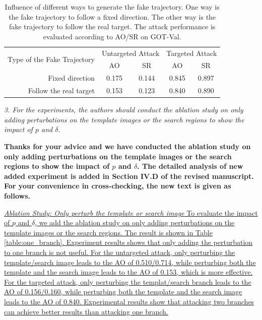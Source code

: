 \documentclass[12pt]{article}
\begin{document}
\begin{table}[t]
  \renewcommand\thetable{X}
  \centering
  \caption{Influence of different ways to generate the fake trajectory. One way is the fake trajectory to follow a fixed direction. The other way is the fake trajectory to follow the real target. The attack performance is evaluated according to AO/SR on GOT-Val.}
  \begin{tabular}{@{}rcccc@{}}
  \toprule
  \multirow{2}{*}[-2pt]{Type of the Fake Trajectory} & \multicolumn{2}{c}{Untargeted Attack} & \multicolumn{2}{c}{Targeted Attack} \\ \cmidrule{2-5}
                              & AO                & SR                & AO               & SR               \\ \midrule
  Fixed direction             & 0.175             & 0.144             & 0.845            & 0.897            \\
  Follow the real target      & 0.153             & 0.123             & 0.840            & 0.890            \\ \bottomrule        
  \end{tabular}
  \label{table:direction}
\end{table}

\textit{3. For the experiments, the authors should conduct the ablation study on only adding perturbations on the template images or the search regions to show the impact of $p$ and $\delta$.}

\textbf{Thanks for your advice and we have conducted the ablation study on only adding perturbations on the template images or the search regions to show the impact of $p$ and $\delta$.
The detailed analysis of new added experiment is added in Section IV.D of the revised manuscript. For your convenience in cross-checking, the new text is given as follows.}

\uline{\textit{Ablation Study: Only perturb the template or search image} To evaluate the impact of $p$ and $\delta$, we add the ablation study on only adding perturbations on the template images or the search regions. The result is shown in Table \ref{table:one_branch}. Experiment results shows that only adding the perturbation to one branch is not useful.
For the untargeted attack, only perturbing the template/search image leads to the AO of 0.510/0.714, while perturbing both the template and the search image leads to the AO of 0.153, which is more effective.
For the targeted attack, only perturbing the templat/search branch leads to the AO of 0.156/0.160, while perturbing both the template and the search image leads to the AO of 0.840. Experimental results show that attacking two branches can achieve better results than attacking one branch.}
\end{document}
